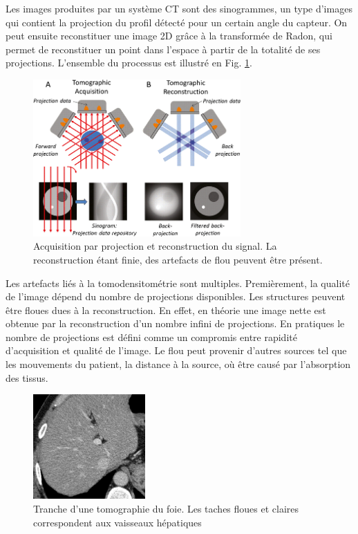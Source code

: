 Les images produites par un système CT sont des sinogrammes, un type d'images qui contient la projection du profil détecté pour un certain angle du capteur. On peut ensuite reconstituer une image 2D grâce à la transformée de Radon, qui permet de reconstituer un point dans l'espace à partir de la totalité de ses projections. L'ensemble du processus est illustré en Fig. \ref{fig:tomography}.

\begin{figure}
    \centering
    \includegraphics[height=6cm]{Images/Tomo_projection.png}
    \caption{Acquisition par projection et reconstruction du signal. La reconstruction étant finie, des artefacts de flou peuvent être présent.}
    \label{fig:tomography}
\end{figure}

Les artefacts liés à la tomodensitométrie sont multiples. Premièrement, la qualité de l'image dépend du nombre de projections disponibles. Les structures peuvent être floues dues à la reconstruction. En effet, en théorie une image nette est obtenue par la reconstruction d'un nombre infini de projections. En pratiques le nombre de projections est défini comme un compromis entre rapidité d'acquisition et qualité de l'image. Le flou peut provenir d'autres sources tel que les mouvements du patient, la distance à la source, où être causé par l'absorption des tissus. 

\begin{figure}
    \centering
    \includegraphics[height=4cm]{Images/blury_vessels.png}
    \caption{Tranche d'une tomographie du foie. Les taches floues et claires  correspondent aux vaisseaux hépatiques}
    \label{fig:CT_blur}
\end{figure}

